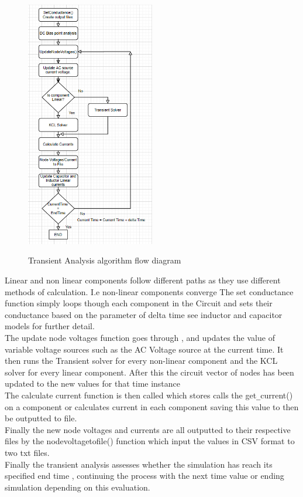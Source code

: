 \documentclass{article}
\begin{document}
\begin{figure}[H]
\centering
\includegraphics[width =0.5\textwidth]{ images/TranAna.PNG}
\label{fig:TranAna} 
\caption{Transient Analysis algorithm flow diagram}
\end{figure}
Linear and non linear components follow different paths as they use different methods of calculation. I.e non-linear components converge
\smallbreak
The set conductance function simply loops though each component in the Circuit and sets their conductance based on the parameter of delta time see inductor and capacitor models for further detail.\\
The update node voltages function goes through , and updates the value of variable voltage sources such as the AC Voltage source at the current time. It then runs the Transient solver for every non-linear component and the KCL solver for every linear component.
After this the circuit vector of nodes has been updated to the new values for that time instance\\
The calculate current function is then called which stores calls the get\verb|_|current() on a component or calculates current in each component saving this value to then be outputted to file.   \\
Finally the new node voltages and currents are all outputted to their respective files by the nodevoltagetofile()  function which input the values in CSV format to two txt files.\\
Finally the transient analysis assesses whether the simulation has reach its specified end time , continuing the process with the next time value or ending simulation depending on this evaluation. 
\end{document}
